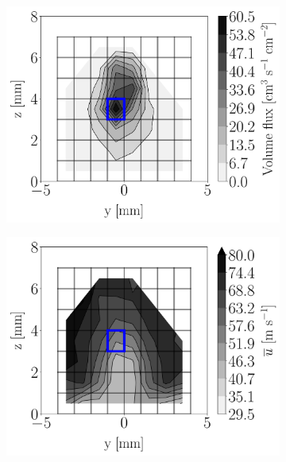 


\begin{figure}[h!]
\centering
\begin{subfigure}[b]{0.3\textwidth}
	\centering
   \includegraphics[scale=0.225]{./part2_developments/figures_ch5_resolved_JICF/injectors_SLI_extra/uG100_dx10_x05_volume_flux_map}
\end{subfigure}
   \hspace{0.17in}
\begin{subfigure}[b]{0.3\textwidth}
	\centering
   \includegraphics[scale=0.225]{./part2_developments/figures_ch5_resolved_JICF/injectors_SLI_extra/uG100_dx10_x05_ux_mean_map}

\end{subfigure}
\end{figure}
